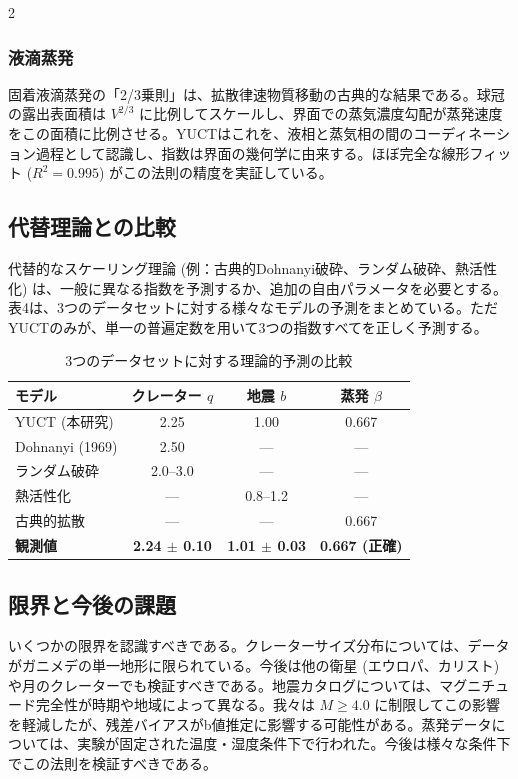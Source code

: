 \documentclass[11pt,a4paper]{article}
\begin{document}
\begin{multicols}{2}
		\subsubsection{液滴蒸発}
		固着液滴蒸発の「2/3乗則」は、拡散律速物質移動の古典的な結果である。球冠の露出表面積は \(V^{2/3}\) に比例してスケールし、界面での蒸気濃度勾配が蒸発速度をこの面積に比例させる。YUCTはこれを、液相と蒸気相の間のコーディネーション過程として認識し、指数は界面の幾何学に由来する。ほぼ完全な線形フィット (\(R^2 = 0.995\)) がこの法則の精度を実証している。
		
		\subsection{代替理論との比較}
		
		代替的なスケーリング理論 (例：古典的Dohnanyi破砕、ランダム破砕、熱活性化) は、一般に異なる指数を予測するか、追加の自由パラメータを必要とする。表4は、3つのデータセットに対する様々なモデルの予測をまとめている。ただYUCTのみが、単一の普遍定数を用いて3つの指数すべてを正しく予測する。
		
		\begin{table}[htbp]
			\centering
			\caption{3つのデータセットに対する理論的予測の比較}
			\label{tab:comparison}
			\begin{tabular}{lccc}
				\toprule
				\textbf{モデル} & \textbf{クレーター \(q\)} & \textbf{地震 \(b\)} & \textbf{蒸発 \(\beta\)} \\
				\midrule
				YUCT (本研究) & 2.25 & 1.00 & 0.667 \\
				Dohnanyi (1969) \cite{Dohnanyi1969} & 2.50 & — & — \\
				ランダム破砕 & 2.0–3.0 & — & — \\
				熱活性化 & — & 0.8–1.2 & — \\
				古典的拡散 & — & — & 0.667 \\
				\textbf{観測値} & \textbf{2.24 $\pm$ 0.10} & \textbf{1.01 $\pm$ 0.03} & \textbf{0.667 (正確)} \\
				\bottomrule
			\end{tabular}
		\end{table}
		
		\subsection{限界と今後の課題}
		
		いくつかの限界を認識すべきである。クレーターサイズ分布については、データがガニメデの単一地形に限られている。今後は他の衛星 (エウロパ、カリスト) や月のクレーターでも検証すべきである。地震カタログについては、マグニチュード完全性が時期や地域によって異なる。我々は \(M \ge 4.0\) に制限してこの影響を軽減したが、残差バイアスがb値推定に影響する可能性がある。蒸発データについては、実験が固定された温度・湿度条件下で行われた。今後は様々な条件下でこの法則を検証すべきである。
		

\end{multicols}
\end{document}
